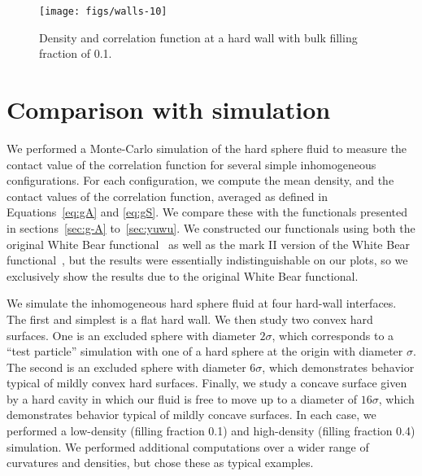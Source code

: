 \documentclass[letterpaper,amsmath,amssymb,10pt,pre]{revtex4-1}
\begin{document}



\begin{figure}
  \texttt{[image: figs/walls-10]}
  \caption{Density and correlation function at a hard wall with bulk
    filling fraction of 0.1.}
  \label{fig:walls-10}
\end{figure}

\section{Comparison with simulation}\label{sec:comparison}

We performed a Monte-Carlo simulation of the hard sphere fluid to
measure the contact value of the correlation function for several
simple inhomogeneous configurations.  For each configuration, we
compute the mean density, and the contact values of the correlation
function, averaged as defined in Equations~\ref{eq:gA} and
\ref{eq:gS}.  We compare these with the functionals presented in
sections~\ref{sec:g-A} to~\ref{sec:yuwu}.  We constructed our
functionals using both the original White Bear
functional~\cite{roth2002whitebear} as well as the mark II version of
the White Bear functional~\cite{hansen2006density}, but the results
were essentially indistinguishable on our plots, so we exclusively
show the results due to the original White Bear functional.

We simulate the inhomogeneous hard sphere fluid at four hard-wall
interfaces.  The first and simplest is a flat hard wall.  We
then study two convex hard surfaces.  One is an excluded sphere with
diameter $2\sigma$, which corresponds to a ``test particle''
simulation with one of a hard sphere at the origin with diameter
$\sigma$.  The second is an excluded sphere with diameter $6\sigma$,
which demonstrates behavior typical of mildly convex hard surfaces.
Finally, we study a concave surface given by a hard cavity in which
our fluid is free to move up to a diameter of $16\sigma$, which
demonstrates behavior typical of mildly concave surfaces.  In each
case, we performed a low-density (filling fraction 0.1) and high-density
(filling fraction 0.4) simulation.  We performed additional
computations over a wider range of curvatures and densities, but
chose these as typical examples.
\end{document}
